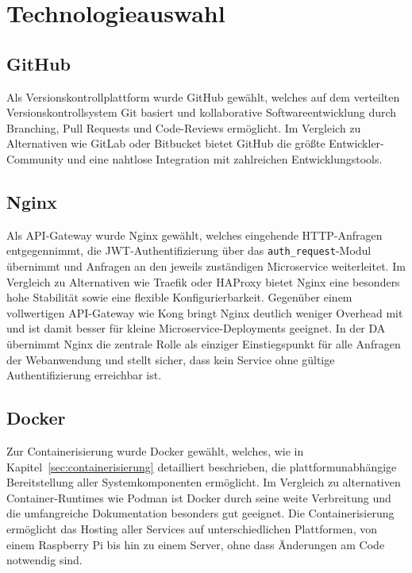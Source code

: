 
\section{Technologieauswahl}

\subsection{GitHub}

Als Versionskontrollplattform wurde GitHub gewählt, welches auf dem 
verteilten Versionskontrollsystem Git basiert und kollaborative 
Softwareentwicklung durch Branching, Pull Requests und Code-Reviews 
ermöglicht.\cite{github}
Im Vergleich zu Alternativen wie GitLab oder Bitbucket bietet GitHub 
die größte Entwickler-Community und eine nahtlose Integration mit zahlreichen 
Entwicklungstools. 

\subsection{Nginx}

Als API-Gateway wurde Nginx gewählt, welches eingehende 
HTTP-Anfragen entgegennimmt, die JWT-Authentifizierung über das 
\texttt{auth\_request}-Modul übernimmt und Anfragen an den jeweils 
zuständigen Microservice weiterleitet.\cite{nginx}
Im Vergleich zu Alternativen wie Traefik oder HAProxy bietet Nginx eine 
besonders hohe Stabilität sowie eine flexible Konfigurierbarkeit. Gegenüber einem vollwertigen API-Gateway wie Kong 
bringt Nginx deutlich weniger Overhead mit und ist damit besser für 
kleine Microservice-Deployments geeignet.
In der DA übernimmt Nginx die zentrale Rolle als einziger 
Einstiegspunkt für alle Anfragen der Webanwendung und stellt sicher, 
dass kein Service ohne gültige Authentifizierung erreichbar ist.

\subsection{Docker}

Zur Containerisierung wurde Docker gewählt, welches, wie in 
Kapitel~\ref{sec:containerisierung} detailliert beschrieben, die 
plattformunabhängige Bereitstellung aller Systemkomponenten ermöglicht. 
\cite{docker_overview}
Im Vergleich zu alternativen Container-Runtimes wie Podman ist Docker 
durch seine weite Verbreitung und die umfangreiche Dokumentation besonders gut geeignet.
Die Containerisierung ermöglicht das Hosting aller Services auf unterschiedlichen Plattformen,
von einem Raspberry Pi bis hin zu einem Server, ohne dass Änderungen am Code notwendig sind.

